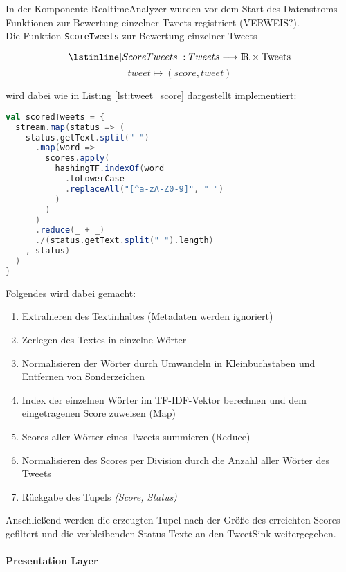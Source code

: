 In der Komponente RealtimeAnalyzer wurden vor dem Start des Datenstroms Funktionen zur Bewertung einzelner Tweets registriert (VERWEIS?).\\

Die Funktion \lstinline|ScoreTweets| zur Bewertung einzelner Tweets

\[\lstinline|ScoreTweets|: Tweets \longrightarrow \rm I\!R \times Tweets\]
\[tweet \mapsto (score, tweet)\]

wird dabei wie in Listing \ref{lst:tweet_score} dargestellt implementiert:

\begin{lstlisting}[language=Scala,caption={Bewertung von Tweets},label={lst:tweet_score}]
val scoredTweets = {
  stream.map(status => (
    status.getText.split(" ")
      .map(word =>
        scores.apply(
          hashingTF.indexOf(word
            .toLowerCase
            .replaceAll("[^a-zA-Z0-9]", " ")
          )
        )
      )
      .reduce(_ + _)
      ./(status.getText.split(" ").length)
    , status)
  )
}
\end{lstlisting}

Folgendes wird dabei gemacht:
\begin{enumerate}
	\item Extrahieren des Textinhaltes (Metadaten werden ignoriert)
	\item Zerlegen des Textes in einzelne Wörter
	\item Normalisieren der Wörter durch Umwandeln in Kleinbuchstaben und Entfernen von Sonderzeichen
	\item Index der einzelnen Wörter im TF-IDF-Vektor berechnen und dem eingetragenen Score zuweisen (Map)
	\item Scores aller Wörter eines Tweets summieren (Reduce)
	\item Normalisieren des Scores per Division durch die Anzahl aller Wörter des Tweets
	\item Rückgabe des Tupels \textit{(Score, Status)}
\end{enumerate}

Anschließend werden die erzeugten Tupel nach der Größe des erreichten Scores gefiltert und die verbleibenden Status-Texte an den TweetSink weitergegeben.\\

\paragraph{Presentation Layer}\\
\\

